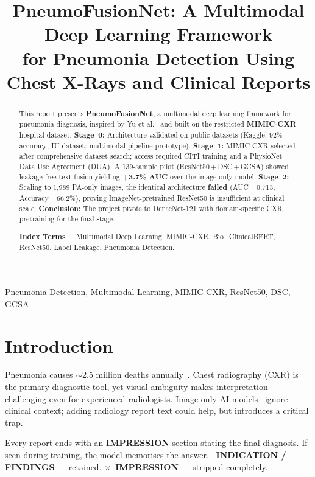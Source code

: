 \documentclass{article}
\title{PneumoFusionNet: A Multimodal Deep Learning Framework\\
for Pneumonia Detection Using Chest X-Rays and Clinical Reports}
\begin{document}
\ninept
\maketitle

\begin{abstract}
This report presents \textbf{PneumoFusionNet}, a multimodal deep learning framework
for pneumonia diagnosis, inspired by Yu et al.~\cite{frontiers2025pneumofusion} and
built on the restricted \textbf{MIMIC-CXR} hospital dataset.
\textbf{Stage~0:} Architecture validated on public datasets (Kaggle: 92\% accuracy;
IU dataset: multimodal pipeline prototype).
\textbf{Stage~1:} MIMIC-CXR selected after comprehensive dataset search; access
required CITI training and a PhysioNet Data Use Agreement (DUA). A 139-sample
pilot (ResNet50\,+\,DSC\,+\,GCSA) showed leakage-free text fusion yielding
\textbf{+3.7\% AUC} over the image-only model.
\textbf{Stage~2:} Scaling to 1,989 PA-only images, the identical architecture
\textbf{failed} (AUC\,=\,0.713, Accuracy\,=\,66.2\%), proving ImageNet-pretrained
ResNet50 is insufficient at clinical scale.
\textbf{Conclusion:} The project pivots to DenseNet-121 with domain-specific
CXR pretraining for the final stage.

\textbf{Index Terms---} Multimodal Deep Learning, MIMIC-CXR, Bio\_ClinicalBERT,
ResNet50, Label Leakage, Pneumonia Detection.
\end{abstract}

\begin{keywords}
Pneumonia Detection, Multimodal Learning, MIMIC-CXR, ResNet50, DSC, GCSA
\end{keywords}

\section{Introduction}

Pneumonia causes $\sim$2.5 million deaths annually~\cite{who2023}. Chest
radiography (CXR) is the primary diagnostic tool, yet visual ambiguity
makes interpretation challenging even for experienced radiologists.
Image-only AI models~\cite{rajpurkar2017chexnet} ignore clinical context;
adding radiology report text could help, but introduces a critical trap.

\begin{tcolorbox}[colback=red!4!white,colframe=red!55!black,
  title=Label Leakage,fonttitle=\small\bfseries,
  top=3pt,bottom=3pt,left=4pt,right=4pt]
\small
Every report ends with an \textbf{IMPRESSION} section stating the final diagnosis.
If seen during training, the model memorises the answer.
\textcolor{successgrn}{\checkmark}~\textbf{INDICATION / FINDINGS} --- retained.\quad
\textcolor{alertred}{\textbf{$\times$}~\textbf{IMPRESSION}} --- stripped completely.
\end{tcolorbox}
\end{document}
